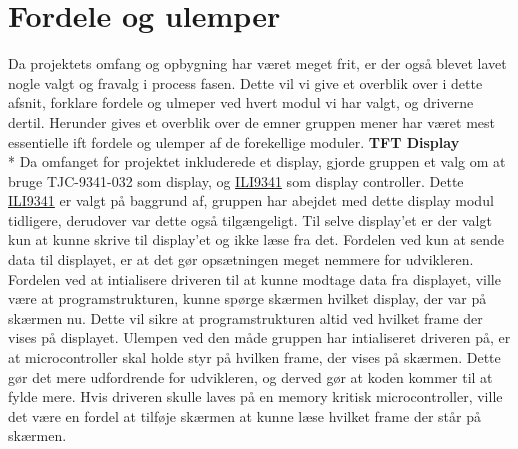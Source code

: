 \graphicspath{{Chapters/Alternative/}}


\section{Fordele og ulemper}
Da projektets omfang og opbygning har været meget frit, er der også blevet lavet nogle valgt og fravalg i process fasen. Dette vil vi give et overblik over i dette afsnit, forklare fordele og ulmeper ved hvert modul vi har valgt, og driverne dertil. Herunder gives et overblik over de emner gruppen mener har været mest essentielle ift fordele og ulemper af de forekellige moduler. 
\newline
\newline
\textbf{TFT Display} \\*
Da omfanget for projektet inkluderede et display, gjorde gruppen et valg om at bruge TJC-9341-032 som display, og \href{https://blackboard.au.dk/bbcswebdav/pid-1697983-dt-content-rid-3847230_1/courses/BB-Cou-UUVA-73302/BB-Cou-UUVA-65758_ImportedContent_20170106021228/BB-Cou-STADS-UUVA-52360_ImportedContent_20160107025559/LAB/Lab3a%20Graphic%20LCD%20Display/Files%20for%20LAB3a/ILI9341_v1.11.pdf}{ILI9341} 
som display controller. Dette \href{https://blackboard.au.dk/bbcswebdav/pid-1697983-dt-content-rid-3847230_1/courses/BB-Cou-UUVA-73302/BB-Cou-UUVA-65758_ImportedContent_20170106021228/BB-Cou-STADS-UUVA-52360_ImportedContent_20160107025559/LAB/Lab3a%20Graphic%20LCD%20Display/Files%20for%20LAB3a/ILI9341_v1.11.pdf}{ILI9341} 
er valgt på baggrund af, gruppen har abejdet med dette display modul tidligere, derudover var dette også tilgængeligt.
Til selve display'et er der valgt kun at kunne skrive til display'et og ikke læse fra det. Fordelen ved kun at sende data til displayet, er at det gør opsætningen meget nemmere for udvikleren. \\
Fordelen ved at intialisere driveren til at kunne modtage data fra displayet, ville være at programstrukturen, kunne spørge skærmen hvilket display, der var på skærmen nu. Dette vil sikre at programstrukturen altid ved hvilket frame der vises på displayet. Ulempen ved den måde gruppen har intialiseret driveren på, er at microcontroller skal holde styr på hvilken frame, der vises på skærmen. Dette gør det mere udfordrende for udvikleren, og derved gør at koden kommer til at fylde mere. Hvis driveren skulle laves på en memory kritisk microcontroller, ville det være en fordel at tilføje skærmen at kunne læse hvilket frame der står på skærmen. \\
